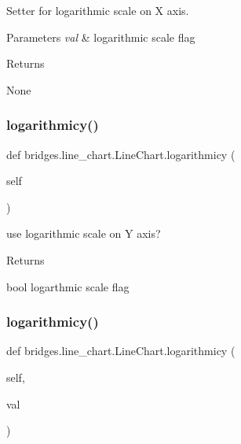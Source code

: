 Setter for logarithmic scale on X axis. 


\begin{DoxyParams}{Parameters}
{\em val} & logarithmic scale flag \\
\hline
\end{DoxyParams}
\begin{DoxyReturn}{Returns}


None 
\end{DoxyReturn}
\mbox{\label{classbridges_1_1line__chart_1_1_line_chart_a7ddc26feab771e7b36e9040ee38fab7f}} 
\subsubsection{\texorpdfstring{logarithmicy()}{logarithmicy()}\hspace{0.1cm}{\footnotesize\ttfamily [1/2]}}
{\footnotesize\ttfamily def bridges.\+line\+\_\+chart.\+Line\+Chart.\+logarithmicy (\begin{DoxyParamCaption}\item[{}]{self }\end{DoxyParamCaption})}



use logarithmic scale on Y axis? 

\begin{DoxyReturn}{Returns}


bool logarthmic scale flag 
\end{DoxyReturn}
\mbox{\label{classbridges_1_1line__chart_1_1_line_chart_ac29eaedd760a3f608f7b11193befa1c5}} 
\subsubsection{\texorpdfstring{logarithmicy()}{logarithmicy()}\hspace{0.1cm}{\footnotesize\ttfamily [2/2]}}
{\footnotesize\ttfamily def bridges.\+line\+\_\+chart.\+Line\+Chart.\+logarithmicy (\begin{DoxyParamCaption}\item[{}]{self,  }\item[{}]{val }\end{DoxyParamCaption})}



